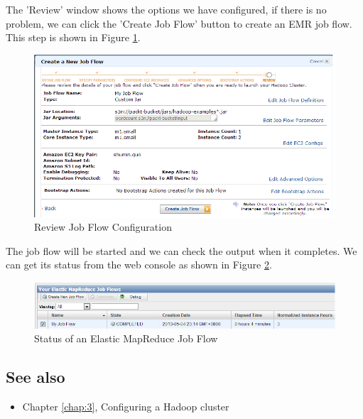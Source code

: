 The 'Review' window shows the options we have configured, if there is no problem, we can click the 'Create Job Flow' button to create an EMR job flow. This step is shown in Figure \ref{fig:aws.elasticmapred.flow.review}.
\begin{figure}[ht]
  \centering
  \includegraphics[width=.95\textwidth]{figs/5163os_08_27.png}
  \caption{Review Job Flow Configuration}\label{fig:aws.elasticmapred.flow.review}
\end{figure} 
The job flow will be started and we can check the output when it completes. We can get its status from the web console as shown in Figure \ref{fig:aws.elasticmapred.flow.status}.
\begin{figure}[ht]
  \centering
  \includegraphics[width=.95\textwidth]{figs/5163os_08_28.png}
  \caption{Status of an Elastic MapReduce Job Flow}\label{fig:aws.elasticmapred.flow.status}
\end{figure} 
\subsection*{See also}
\begin{itemize}
  \item Chapter \ref{chap:3}, Configuring a Hadoop cluster
\end{itemize}
